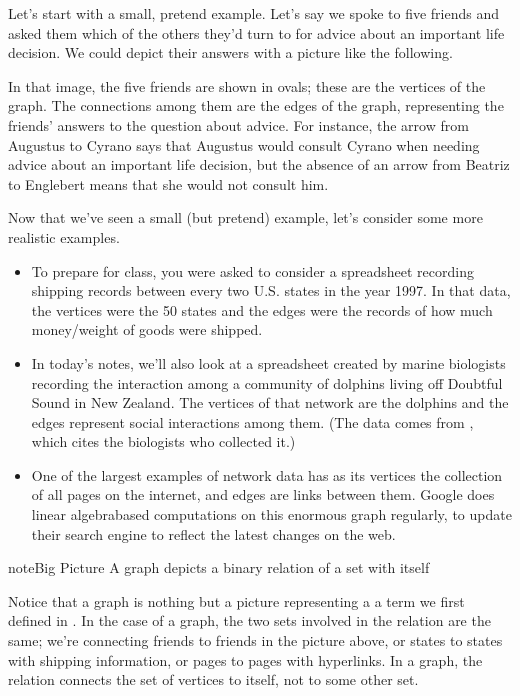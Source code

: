 \documentclass[letterpaper,10pt,english]{sphinxmanual}
\begin{document}
Let’s start with a small, pretend example.  Let’s say we spoke to five friends and asked them which of the others they’d turn to for advice about an important life decision.  We could depict their answers with a picture like the following.


In that image, the five friends are shown in ovals; these are the vertices of the graph.  The connections among them are the edges of the graph, representing the friends’ answers to the question about advice.  For instance, the arrow from Augustus to Cyrano says that Augustus would consult Cyrano when needing advice about an important life decision, but the absence of an arrow from Beatriz to Englebert means that she would not consult him.

Now that we’ve seen a small (but pretend) example, let’s consider some more realistic examples.
\begin{itemize}
\item {} 
To prepare for class, you were asked to consider a spreadsheet recording shipping records between every two U.S. states in the year 1997.  In that data, the vertices were the 50 states and the edges were the records of how much money/weight of goods were shipped.

\item {} 
In today’s notes, we’ll also look at a spreadsheet created by marine biologists recording the interaction among a community of dolphins living off Doubtful Sound in New Zealand.  The vertices of that network are the dolphins and the edges represent social interactions among them.  (The data comes from , which cites the biologists who collected it.)

\item {} 
One of the largest examples of network data has as its vertices the collection of all pages on the internet, and edges are links between them.  Google does linear algebra\sphinxhyphen{}based computations on this enormous graph regularly, to update their search engine to reflect the latest changes on the web.

\end{itemize}

\begin{sphinxadmonition}{note}{Big Picture \sphinxhyphen{} A graph depicts a binary relation of a set with itself}

Notice that a graph is nothing but a picture representing a  a term we first defined in {\hyperref[\detokenize{chapter-2-mathematical-foundations::doc}]{}}.  In the case of a graph, the two sets involved in the relation are the same; we’re connecting friends to friends in the picture above, or states to states with shipping information, or pages to pages with hyperlinks.  In a graph, the relation connects the set of vertices to itself, not to some other set.
\end{sphinxadmonition}
\end{document}
